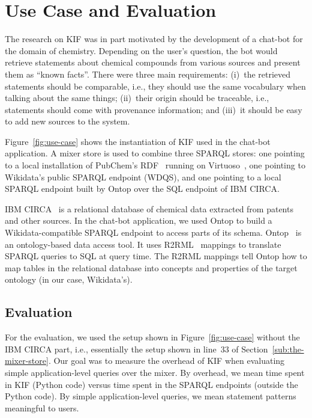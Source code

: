 \section{Use Case and Evaluation}%
\label{sec:use-case-and-evaluation}


The research on KIF was in part motivated by the development of a chat-bot for the domain of chemistry.
Depending on the user's question, the bot would retrieve statements about chemical compounds from various sources and present them as ``known facts''.
There were three main requirements: (i)~the retrieved statements should be comparable, i.e., they should use the same vocabulary when talking about the same things; (ii)~their origin should be traceable, i.e., statements should come with provenance information; and (iii)~it should be easy to add new sources to the system.


Figure~\ref{fig:use-case} shows the instantiation of KIF used in the chat-bot application.
A mixer store is used to combine three SPARQL stores: one pointing to a local installation of PubChem's RDF~\cite{Fu-G-2015} running on Virtuoso~\cite{Erling-O-2012}, one pointing to Wikidata's public SPARQL endpoint (WDQS), and one pointing to a local SPARQL endpoint built by Ontop over the SQL endpoint of IBM CIRCA\@.





IBM CIRCA~\cite{IBM-CIRCA} is a relational database of chemical data extracted from patents and other sources.
In the chat-bot application, we used Ontop to build a Wikidata-compatible SPARQL endpoint to access parts of its schema.
Ontop~\cite{Xiao-G-2020} is an ontology-based data access tool.
It uses R2RML~\cite{Cyganiak-R-2012} mappings to translate SPARQL queries to SQL at query time.
The R2RML mappings tell Ontop how to map tables in the relational database into concepts and properties of the target ontology (in our case, Wikidata's).


\subsection{Evaluation}


For the evaluation, we used the setup shown in Figure~\ref{fig:use-case} without the IBM CIRCA part, i.e., essentially the setup shown in line~33 of Section~\ref{sub:the-mixer-store}.
Our goal was to measure the overhead of KIF when evaluating simple application-level queries over the mixer.
By overhead, we mean time spent in KIF (Python code) versus time spent in the SPARQL endpoints (outside the Python code).
By simple application-level queries, we mean statement patterns meaningful to users.


